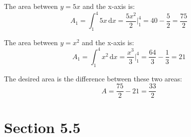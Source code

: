 \documentclass{exam}
\begin{document}
\begin{solution}

The area between $y = 5x$ and the x-axis is:
\[
  A_1 = \int_1^4 5x \, \mathrm{d}x = \frac{5x^2}{2} \bigg|_1^4 = 40 - \frac{5}{2} = \frac{75}{2}
\]

The area between $y = x^2$ and the x-axis is:
\[
  A_1 = \int_1^4 x^2 \, \mathrm{d}x = \frac{x^3}{3} \bigg|_1^4 = \frac{64}{3} - \frac{1}{3} = 21
\]

The desired area is the difference  between these two areas:
\[
  A = \frac{75}{2} - 21 = \frac{33}{2}
\]

\end{solution}

\ifprintanswers
\pagebreak

\section{Section 5.5}

\end{document}
